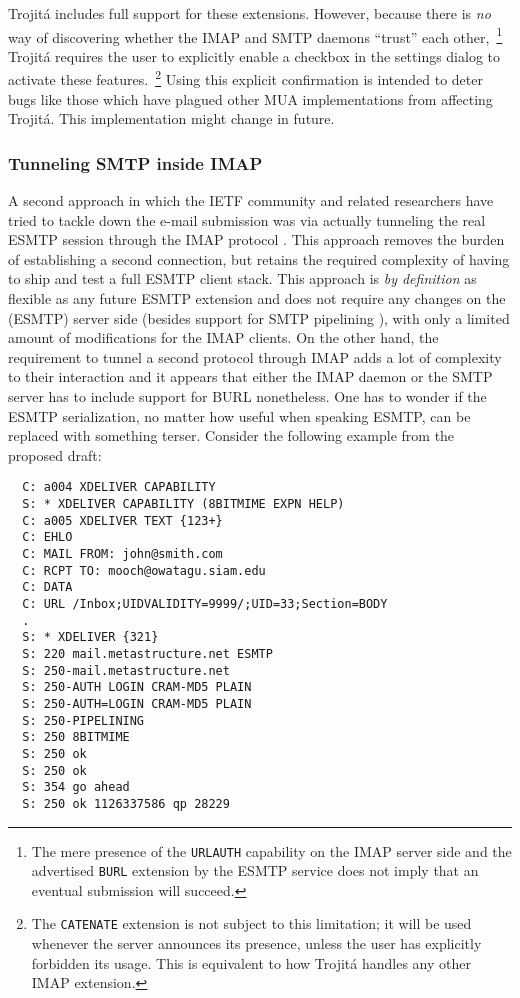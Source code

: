 \documentclass[trojita]{subfiles}
\begin{document}
Trojitá includes full support for these extensions.  However, because there is {\em no} way of discovering whether the
IMAP and SMTP daemons ``trust'' each other,~\footnote{The mere presence of the {\tt URLAUTH} capability on the IMAP
server side and the advertised {\tt BURL} extension by the ESMTP service does not imply that an eventual submission will
succeed.} Trojitá requires the user to explicitly enable a checkbox in the settings dialog to activate these
features.~\footnote{The {\tt CATENATE} extension is not subject to this limitation; it will be used whenever the server
announces its presence, unless the user has explicitly forbidden its usage.  This is equivalent to how Trojitá handles
any other IMAP extension.}  Using this explicit confirmation is intended to deter bugs like those which have plagued
other MUA implementations \cite{qmf-fastmail-burl-bug} from affecting Trojitá.  This implementation might change in
future.

\subsubsection{Tunneling SMTP inside IMAP}

A second approach in which the IETF community and related researchers have tried to tackle down the e-mail submission
was via actually tunneling the real ESMTP session through the IMAP protocol \cite[p. 30]{draft-maes-lemonade-p-imap}.
This approach removes the burden of establishing a second connection, but retains the required complexity of having to
ship and test a full ESMTP client stack.  This approach is {\em by definition} as flexible as any future ESMTP extension
and does not require any changes on the (ESMTP) server side (besides support for SMTP pipelining \cite{rfc2920}), with
only a limited amount of modifications for the IMAP clients.  On the other hand, the requirement to tunnel a second
protocol through IMAP adds a lot of complexity to their interaction and it appears that either the IMAP daemon or the
SMTP server has to include support for BURL nonetheless.  One has to wonder if the ESMTP serialization, no matter how
useful when speaking ESMTP, can be replaced with something terser.  Consider the following example from the proposed
draft:

\begin{verbatim}
  C: a004 XDELIVER CAPABILITY
  S: * XDELIVER CAPABILITY (8BITMIME EXPN HELP)
  C: a005 XDELIVER TEXT {123+}
  C: EHLO
  C: MAIL FROM: john@smith.com
  C: RCPT TO: mooch@owatagu.siam.edu
  C: DATA
  C: URL /Inbox;UIDVALIDITY=9999/;UID=33;Section=BODY
  .
  S: * XDELIVER {321}
  S: 220 mail.metastructure.net ESMTP
  S: 250-mail.metastructure.net
  S: 250-AUTH LOGIN CRAM-MD5 PLAIN
  S: 250-AUTH=LOGIN CRAM-MD5 PLAIN
  S: 250-PIPELINING
  S: 250 8BITMIME
  S: 250 ok
  S: 250 ok
  S: 354 go ahead
  S: 250 ok 1126337586 qp 28229
\end{verbatim}
\end{document}
